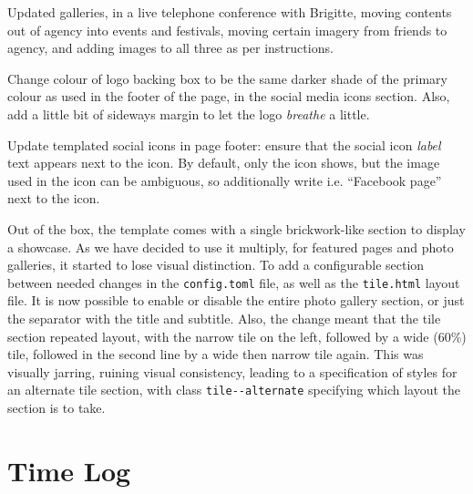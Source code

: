 \documentclass{article}
\begin{document}
Updated galleries, in a live telephone conference with Brigitte, moving
contents out of agency into events and festivals, moving certain imagery from
friends to agency, and adding images to all three as per instructions.

Change colour of logo backing box to be the same darker shade of the primary
colour as used in the footer of the page, in the social media icons section.
Also, add a little bit of sideways margin to let the logo \emph{breathe} a little.

Update templated social icons in page footer: ensure that the social icon
\emph{label} text appears next to the icon. By default, only the icon shows, but
the image used in the icon can be ambiguous, so additionally write i.e. ``Facebook
page'' next to the icon.

Out of the box, the template comes with a single brickwork-like section to
display a showcase. As we have decided to use it multiply, for featured pages
and photo galleries, it started to lose visual distinction. To add a
configurable section between needed changes in the \texttt{config.toml} file, as
well as the \texttt{tile.html} layout file. It is now possible to enable or disable
the entire photo gallery section, or just the separator with the title and
subtitle. Also, the change meant that the tile section repeated layout, with
the narrow tile on the left, followed by a wide (60\%) tile, followed in the
second line by a wide then narrow tile again. This was visually jarring,
ruining visual consistency, leading to a specification of styles for an
alternate tile section, with class \texttt{tile-{}-alternate} specifying which layout
the section is to take.


\section{Time Log}
\label{sec:org0c5bcad}
\end{document}
